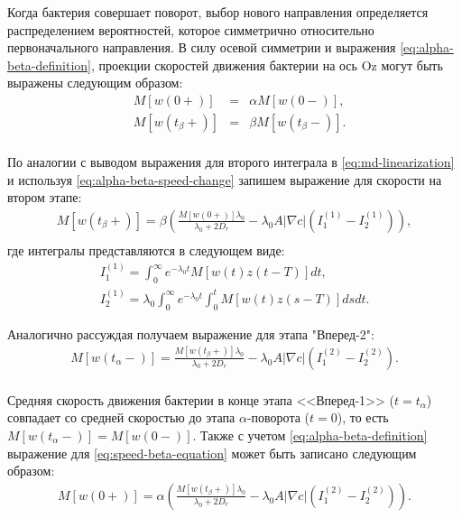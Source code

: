 Когда бактерия совершает поворот, выбор нового направления определяется распределением вероятностей, которое симметрично относительно первоначального направления. В силу осевой симметрии и выражения \cref{eq:alpha-beta-definition}, проекции скоростей движения бактерии на ось Oz могут быть выражены следующим образом:
\begin{equation}
    \begin{aligned}
        &M[w(0+)]&=&\alpha M[w(0-)], \\
        &M[w(t_{\beta}+)]& = &\beta M[w(t_{\beta}-)]. \\
        \label{eq:alpha-beta-speed-change}
    \end{aligned}
\end{equation}

По аналогии с выводом выражения для второго интеграла в \cref{eq:md-linearization} и используя \cref{eq:alpha-beta-speed-change} запишем выражение для скорости на втором этапе:
\begin{equation}
    \begin{aligned}
        M[w(t_{\beta}+)] = \beta \left ( \frac{M[w(0+)] \lambda_0}{\lambda_0 + 2 D_r} - \lambda_0 A |\nabla c| (I_1^{(1)} - I_2^{(1)}) \right ), \\
        \label{eq:speed-beta-equation}
    \end{aligned}
\end{equation}
где интегралы представляются в следующем виде:
\begin{equation}
    \begin{aligned}
        I_1^{(1)}=\int_0^{\infty} e^{-\lambda_0t} M[w(t)z(t-T)]dt, \\
        I_2^{(1)}=\lambda_0 \int_0^{\infty} e^{-\lambda_0t} \int_0^{t} M[w(t)z(s-T)]ds dt.
        \label{eq:speed-integrals}
    \end{aligned}
\end{equation}

Аналогично рассуждая получаем выражение для этапа "Вперед-2":
\begin{equation}
    \begin{aligned}
        M[w(t_{\alpha}-)] = \frac{M[w(t_{\beta}+)] \lambda_0}{\lambda_0 + 2 D_r} - \lambda_0 A |\nabla c| (I_1^{(2)} - I_2^{(2)}). \\
        \label{eq:speed-alpha-formula}
    \end{aligned}
\end{equation}

Средняя скорость движения бактерии в конце этапа <<Вперед-1>> ($t=t_{\alpha}$) совпадает со средней скоростью до этапа $\alpha$-поворота ($t=0$), то есть $M[w(t_{\alpha}-)]=M[w(0-)]$. Также с учетом \cref{eq:alpha-beta-definition} выражение для \cref{eq:speed-beta-equation} может быть записано следующим образом:
\begin{equation}
    \begin{aligned}
        M[w(0+)] = \alpha \left ( \frac{M[w(t_{\beta}+)] \lambda_0}{\lambda_0 + 2 D_r} - \lambda_0 A |\nabla c| (I_1^{(2)} - I_2^{(2)}) \right ). \\
        \label{eq:speed-alpha-equation}
    \end{aligned}
\end{equation}

